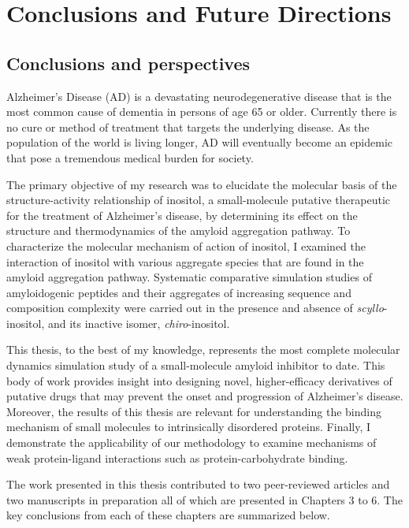 
\chapter{Conclusions and Future Directions}
\section{Conclusions and perspectives}
Alzheimer's Disease (AD) is a devastating neurodegenerative disease that is the most common cause of dementia in persons of age 65 or older. Currently there is no cure or method of treatment that targets the underlying disease.  As the population of the world is living longer, AD will eventually become an epidemic that pose a tremendous medical burden for society. 

The primary objective of my research was to elucidate the molecular basis of the structure-activity relationship of inositol, a small-molecule putative therapeutic for the treatment of Alzheimer's disease, by determining its effect on the structure and thermodynamics of the amyloid aggregation pathway.  To characterize the molecular mechanism of action of inositol, I examined the interaction of inositol with various aggregate species that are found in the amyloid aggregation pathway. Systematic comparative simulation studies of amyloidogenic peptides and their aggregates of increasing sequence and composition complexity were carried out in the presence and absence of \emph{scyllo}-inositol, and its inactive isomer, \emph{chiro}-inositol.

This thesis, to the best of my knowledge, represents the most complete molecular dynamics simulation study of a small-molecule amyloid inhibitor to date. This body of work provides insight into designing novel, higher-efficacy derivatives of putative drugs  that may prevent the onset and progression of Alzheimer's disease.  Moreover, the results of this thesis are relevant for understanding the binding mechanism of small molecules to intrinsically disordered proteins. Finally, I demonstrate the applicability of our methodology to examine mechanisms of weak protein-ligand interactions such as protein-carbohydrate binding.

The work presented in this thesis contributed to two peer-reviewed articles and two manuscripts in preparation all of which are presented in Chapters 3 to 6.  The key conclusions from each of these chapters are summarized below.

